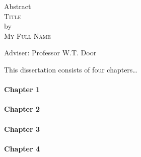 \begin{center}
Abstract \\
\textsc{Title} \\
by \\
\textsc{My Full Name} \\[0.25in]
\end{center}

\vspace{0.25in}

\noindent Adviser: Professor W.T. Door

\vspace{0.25in}

\noindent This dissertation consists of four chapters\ldots

\paragraph{Chapter 1} 

\paragraph{Chapter 2} 

\paragraph{Chapter 3} 

\paragraph{Chapter 4} 